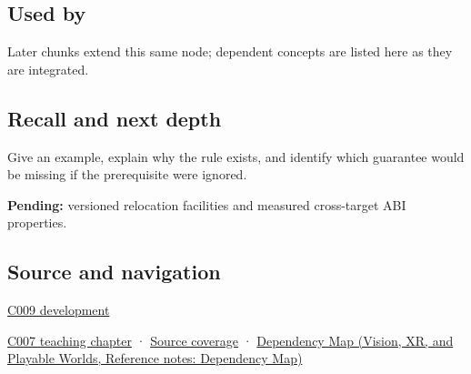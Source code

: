 \subsection{Used by}\label{appendix-958870a64c53-used-by}

\hypertarget{appendix-958870a64c53-used-by}{}

Later chunks extend this same node; dependent concepts are listed here as they are integrated.

\subsection{Recall and next depth}\label{appendix-958870a64c53-recall-and-next-depth}

\hypertarget{appendix-958870a64c53-recall-and-next-depth}{}

Give an example, explain why the rule exists, and identify which guarantee would be missing if the prerequisite were ignored.

\textbf{Pending:} versioned relocation facilities and measured cross-target ABI properties.

\subsection{Source and navigation}\label{appendix-958870a64c53-source-and-navigation}

\hypertarget{appendix-958870a64c53-source-and-navigation}{}

\hyperref[appendix-fd090d982a15-m009---parts-127-147]{C009 development}

\hyperref[01-foundations-i-ch003-bringing-the-object-model-back-to-bytes]{C007 teaching chapter} · \hyperref[appendix-fd090d982a15-m007---parts-101-112]{Source coverage} · \href{../07-Vision-XR-and-Playable-Worlds/main.pdf\#nameddest=appendix-4ad47bdd269a}{Dependency Map (Vision, XR, and Playable Worlds, Reference notes: Dependency Map)}

